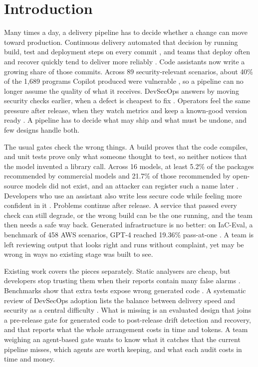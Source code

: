 \documentclass[12pt,onecolumn,draftclsnofoot]{IEEEtran}
\begin{document}
\section{Introduction}
Many times a day, a delivery pipeline has to decide whether a change can move toward production. Continuous delivery automated that decision by running build, test and deployment steps on every commit \cite{humble2010}, and teams that deploy often and recover quickly tend to deliver more reliably \cite{forsgren2018}. Code assistants now write a growing share of those commits. Across 89 security-relevant scenarios, about 40\% of the 1,689 programs Copilot produced were vulnerable \cite{pearce2022}, so a pipeline can no longer assume the quality of what it receives. DevSecOps answers by moving security checks earlier, when a defect is cheapest to fix \cite{rajapakse2022}. Operators feel the same pressure after release, when they watch metrics and keep a known-good version ready \cite{beyer2016}. A pipeline has to decide what may ship and what must be undone, and few designs handle both.

The usual gates check the wrong things. A build proves that the code compiles, and unit tests prove only what someone thought to test, so neither notices that the model invented a library call. Across 16 models, at least 5.2\% of the packages recommended by commercial models and 21.7\% of those recommended by open-source models did not exist, and an attacker can register such a name later \cite{spracklen2025}. Developers who use an assistant also write less secure code while feeling more confident in it \cite{perry2023}. Problems continue after release. A service that passed every check can still degrade, or the wrong build can be the one running, and the team then needs a safe way back. Generated infrastructure is no better: on IaC-Eval, a benchmark of 458 AWS scenarios, GPT-4 reached 19.36\% pass-at-one \cite{kon2024}. A team is left reviewing output that looks right and runs without complaint, yet may be wrong in ways no existing stage was built to see.

Existing work covers the pieces separately. Static analysers are cheap, but developers stop trusting them when their reports contain many false alarms \cite{johnson2013}. Benchmarks show that extra tests expose wrong generated code \cite{liu2023evalplus}. A systematic review of DevSecOps adoption lists the balance between delivery speed and security as a central difficulty \cite{rajapakse2022}. What is missing is an evaluated design that joins a pre-release gate for generated code to post-release drift detection and recovery, and that reports what the whole arrangement costs in time and tokens. A team weighing an agent-based gate wants to know what it catches that the current pipeline misses, which agents are worth keeping, and what each audit costs in time and money.
\end{document}
